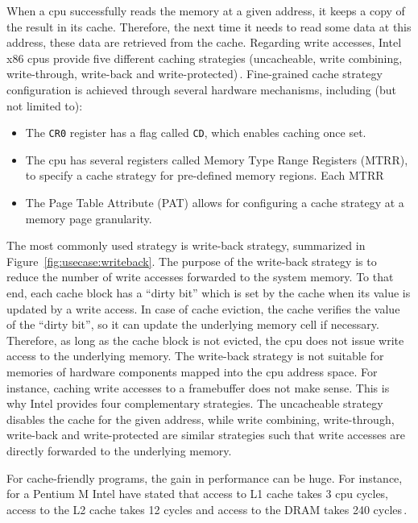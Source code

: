 When a \ac{cpu} successfully reads the memory at a given address, it keeps a
copy of the result in its cache.
%
Therefore, the next time it needs to read some data at this address, these data
are retrieved from the cache.
%
Regarding write accesses, Intel x86 \acp{cpu} provide five different caching
strategies (uncacheable, write combining, write-through, write-back and
write-protected)\,\cite[Volume 3, Chapter~11]{intel2014manual}.
%
Fine-grained cache strategy configuration is achieved through several hardware
mechanisms, including (but not limited to):
%
\begin{itemize}
\item The \texttt{CR0} register has a flag called \texttt{CD}, which enables
  caching once set.
%
\item The \ac{cpu} has several registers called Memory Type Range Registers
  (MTRR), to specify a cache strategy for pre-defined memory regions.
  Each MTRR
\item The Page Table Attribute (PAT) allows for configuring a cache strategy at
  a memory page granularity.
\end{itemize}
%
The most commonly used strategy is write-back strategy, summarized in
Figure~\ref{fig:usecase:writeback}.
%
The purpose of the write-back strategy is to reduce the number of write accesses
forwarded to the system memory.
%
To that end, each cache block has a ``dirty bit'' which is set by the cache when
its value is updated by a write access.
%
In case of cache eviction, the cache verifies the value of the ``dirty bit'', so
it can update the underlying memory cell if necessary.
%
Therefore, as long as the cache block is not evicted, the \ac{cpu} does not
issue write access to the underlying memory.
%
The write-back strategy is not suitable for memories of hardware components
mapped into the \ac{cpu} address space.
%
For instance, caching write accesses to a framebuffer does not make sense.
%
This is why Intel provides four complementary strategies.
%
The uncacheable strategy disables the cache for the given address, while write
combining, write-through, write-back and write-protected are similar strategies
such that write accesses are directly forwarded to the underlying memory.

For cache-friendly programs, the gain in performance can be huge.
%
For instance, for a Pentium M Intel have stated that access to L1 cache takes 3
\ac{cpu} cycles, access to the L2 cache takes 12 cycles and access to the DRAM
takes 240 cycles\,\cite{drepper2007memory}.

